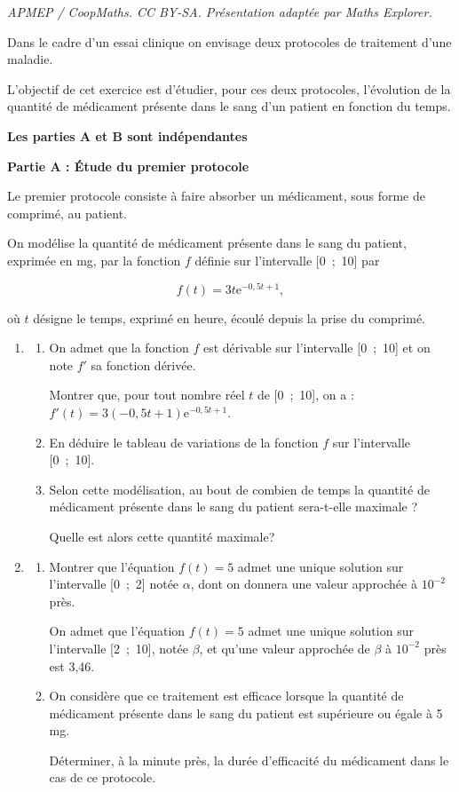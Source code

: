 \documentclass[10pt]{article}
\begin{document}
\noindent\textit{APMEP / CoopMaths. CC BY-SA. Présentation adaptée par Maths Explorer.}\par\medskip
\medskip

Dans le cadre d'un essai clinique on envisage deux protocoles de traitement 
d'une maladie.

L'objectif de cet exercice est d'étudier, pour ces deux protocoles, l'évolution de la quantité de médicament présente dans le sang d'un patient en fonction du temps.

\medskip

\textbf{Les parties A et B sont indépendantes}

\medskip

\textbf{Partie A : Étude du premier protocole}

\medskip

Le premier protocole consiste à faire absorber un médicament, sous forme de comprimé, au patient.

On modélise la quantité de médicament présente dans le sang du patient, exprimée en mg, par la fonction $f$ définie sur l'intervalle [0~;~10] par 

\[f(t) = 3t\text{e}^{-0,5t+1},\]

où $t$ désigne le temps, exprimé en heure, écoulé depuis la prise du comprimé.

\medskip

\begin{enumerate}
\item 
	\begin{enumerate}
		\item On admet que la fonction $f$ est dérivable sur l'intervalle [0~;~10] et on note $f'$ sa fonction dérivée.
		
Montrer que, pour tout nombre réel $t$ de [0~;~10], on a : $f'(t) = 3(- 0,5t + 1)\text{e}^{-0,5t+1}$.
		\item En déduire le tableau de variations de la fonction $f$ sur l'intervalle [0~;~10].
		\item Selon cette modélisation, au bout de combien de temps la quantité de médicament présente dans le sang du patient sera-t-elle maximale ?
		
Quelle est alors cette quantité maximale?
	\end{enumerate}
\item 
	\begin{enumerate}
		\item Montrer que l'équation $f(t) = 5$ admet une unique solution sur l'intervalle [0~;~2] notée $\alpha$, dont on donnera une valeur approchée à $10^{-2}$ près.
		
On admet que l'équation $f(t) = 5$ admet une unique solution sur l'intervalle [2~;~10], notée $\beta$, et qu'une valeur approchée de $\beta$ à $10^{-2}$ près est 3,46.
		\item On considère que ce traitement est efficace lorsque la quantité de médicament présente dans le sang du patient est supérieure ou égale à 5 mg.
		
Déterminer, à la minute près, la durée d'efficacité du médicament dans le cas de ce protocole.
	\end{enumerate}
\end{enumerate}
\end{document}

